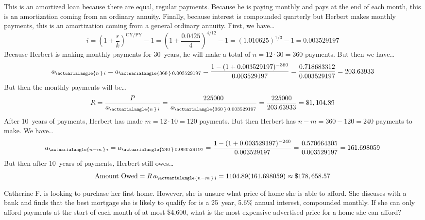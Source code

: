 \documentclass[11pt,letterpaper]{article}
\begin{document}
\sol This is an amortized loan because there are equal, regular payments. Because he is paying monthly and pays at the end of each month, this is an amortization coming from an ordinary annuity. Finally, because interest is compounded quarterly but Herbert makes monthly payments, this is an amortization coming from a general ordinary annuity. First, we have\dots
	\[
	i= \left(1 + \dfrac{r}{k} \right)^{\text{CY}/\text{PY}} - 1= \left(1 + \dfrac{0.0425}{4} \right)^{\text{4}/\text{12}} - 1= (1.010625)^{1/3} - 1= 0.003529197
	\]
Because Herbert is making monthly payments for 30~years, he will make a total of $n= 12 \cdot 30= 360$ payments. But then we have\dots
	\[
	a_{\actuarialangle{n\,}\, i}= a_{\actuarialangle{360\,}\, 0.003529197}= \dfrac{1 - (1 + 0.003529197)^{-360}}{0.003529197}= \dfrac{0.718683312}{0.003529197}= 203.63933
	\]
But then the monthly payments will be\dots
	\[
	R= \dfrac{P}{a_{\actuarialangle{n\,}\, i}}= \dfrac{225000}{a_{\actuarialangle{360\,}\, 0.003529197}}= \dfrac{225000}{203.63933}= \$1,104.89
	\]
After 10~years of payments, Herbert has made $m= 12 \cdot 10= 120$ payments. But then Herbert has $n - m= 360 - 120= 240$ payments to make. We have\dots
	\[
	a_{\actuarialangle{n - m\,}\, i}= a_{\actuarialangle{240\,}\, 0.003529197}= \dfrac{1 - (1 + 0.003529197)^{-240}}{0.003529197}= \dfrac{0.570664305}{0.003529197}= 161.698059
	\]
But then after 10~years of payments, Herbert still owes\dots
	\[
	\text{Amount Owed}= R\, a_{\actuarialangle{n - m\,}\, i}= 1104.89 (161.698059) \approx \$178,658.57
	\]



\newpage



 Catherine F. is looking to purchase her first home. However, she is unsure what price of home she is able to afford. She discuses with a bank and finds that the best mortgage she is likely to qualify for is a 25~year, 5.6\% annual interest, compounded monthly. If she can only afford payments at the start of each month of at most \$4,600, what is the most expensive advertised price for a home she can afford? \pspace
\end{document}
